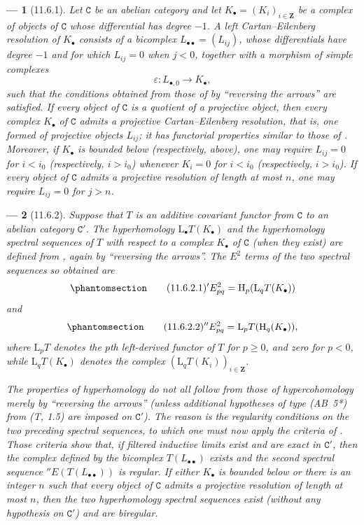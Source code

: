 \documentclass[oneside]{amsart}
\theoremstyle{ega-env-style}
\newtheorem*{env}{---}
\theoremstyle{ega-thm-env-style}
\theoremstyle{ega-defn-env-style}
\def\bb{\mathbf}                    %
\def\cat{\mathtt}                   %
\def\geq{\geqslant}                 %
\def\HH{\mathrm{H}}                 %
\def\LL{\mathrm{L}}                 %
\newcommand{\oldpage}[2][]{{\marginnote{\normalfont{\textbf{#1}~|~#2}}}\ignorespaces}
\let\EGAOriginalLabel\label
\renewcommand{\label}[1]{\phantomsection\EGAOriginalLabel{#1}}
\begin{document}
\begin{env}[11.6.1]
\label{0.11.6.1}
Let $\cat{C}$ be an abelian category and let $K_\bullet=(K_i)_{i\in\bb{Z}}$ be a complex of objects of $\cat{C}$ whose differential has degree $-1$.
A \emph{left Cartan--Eilenberg resolution} of $K_\bullet$ consists of a bicomplex $L_{\bullet\bullet}=(L_{ij})$, whose differentials have degree $-1$ and for which $L_{ij}=0$ when $j<0$, together with a morphism of simple complexes
\[
  \varepsilon:L_{\bullet,0}\longrightarrow K_\bullet,
\]
such that the conditions obtained from those of  by ``reversing the arrows'' are satisfied.
If every object of $\cat{C}$ is a quotient of a projective object, then every complex $K_\bullet$ of $\cat{C}$ admits a \emph{projective Cartan--Eilenberg resolution}, that is, one formed of projective objects $L_{ij}$; it has functorial properties similar to those of .
Moreover, if $K_\bullet$ is bounded below (respectively, above), one may require $L_{ij}=0$ for $i<i_0$ (respectively, $i>i_0$) whenever $K_i=0$ for $i<i_0$ (respectively, $i>i_0$).
If every object of $\cat{C}$ admits a projective resolution of length at most $n$, one may require $L_{ij}=0$ for $j>n$.
\end{env}

\begin{env}[11.6.2]
\label{0.11.6.2}
\oldpage[0\textsubscript{III}]{40}
Suppose that $T$ is an additive covariant functor from $\cat{C}$ to an abelian category $\cat{C}'$.
The \emph{hyperhomology} $\LL_\bullet T(K_\bullet)$ and the \emph{hyperhomology spectral sequences} of $T$ with respect to a complex $K_\bullet$ of $\cat{C}$ (when they exist) are defined from , again by ``reversing the arrows''.
The $E^2$ terms of the two spectral sequences so obtained are
\[
\label{0.11.6.2.1}
\tag{11.6.2.1}
  {}'E^2_{pq}
  =\HH_p(\LL_qT(K_\bullet))
\]
and
\[
\label{0.11.6.2.2}
\tag{11.6.2.2}
  {}''E^2_{pq}
  =\LL_pT(\HH_q(K_\bullet)),
\]
where $\LL_pT$ denotes the $p$th left-derived functor of $T$ for $p\geq0$, and zero for $p<0$, while $\LL_qT(K_\bullet)$ denotes the complex $(\LL_qT(K_i))_{i\in\bb{Z}}$.

The properties of hyperhomology do not all follow from those of hypercohomology merely by ``reversing the arrows'' (unless additional hypotheses of type (AB~5*) from (T, 1.5) are imposed on $\cat{C}'$).
The reason is the regularity conditions on the two preceding spectral sequences, to which one must now apply the criteria of .
Those criteria show that, if filtered inductive limits exist and are exact in $\cat{C}'$, then the complex defined by the bicomplex $T(L_{\bullet\bullet})$ exists and the \emph{second} spectral sequence ${}''E(T(L_{\bullet\bullet}))$ is regular.
If either $K_\bullet$ is bounded below or there is an integer $n$ such that every object of $\cat{C}$ admits a projective resolution of length at most $n$, then the \emph{two} hyperhomology spectral sequences exist (without any hypothesis on $\cat{C}'$) and are biregular.
\end{env}
\end{document}
